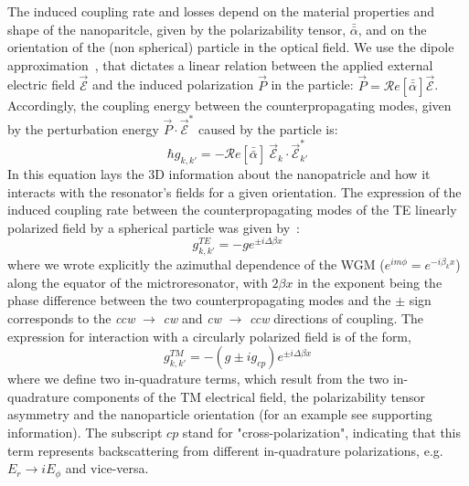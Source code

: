 \documentclass[journal=jacsat,manuscript=article]{achemso}
\begin{document}
The induced coupling rate and losses depend on the material properties and shape of the nanoparitcle, given by the polarizability tensor, $\bar{ \bar\alpha}$, and on the orientation of the (non spherical) particle in the optical field. We use the dipole approximation~\cite{mazzei2007}, that dictates a linear relation between the applied external electric field $ \vec {\mathcal {E}}$ and the induced polarization $\vec P$ in the particle: $ \vec {P} =\mathcal{R}e [\bar{ \bar \alpha}] \vec {\mathcal E} $. Accordingly, the coupling energy between the counterpropagating modes, given by the perturbation energy $ \vec {P} \cdot \vec {\mathcal E}^*$ caused by the particle is:
\begin{equation}\label{g_k_ktag}
    \hbar g_{k,k'}=  - \mathcal{R}e [\bar{\bar \alpha}] ~\vec{ \mathcal{E}}_k \cdot  \vec{ \mathcal{E}}^*_{k'}
\end{equation}
In this equation lays the 3D information about the nanopatricle and how it interacts with the resonator's fields for a given orientation. The expression of the induced coupling rate between the counterpropagating modes of the TE linearly polarized field by a spherical particle was given by~\cite{yi2011multiple}:
\begin{equation} \label{eq:g_TE_nanotube}
g^{TE}_{k,k'} = - g e^{\pm i \Delta\beta x}
\end{equation}
where we wrote explicitly the azimuthal dependence of the WGM ($e^{im\phi}=e^{-i\beta_k x}$) along the equator of the mictroresonator, with $2\beta x $ in the exponent being the phase difference between the two counterpropagating modes and the $\pm$ sign corresponds to the \textit{ccw} $\rightarrow$ \textit{cw} and \textit{cw} $\rightarrow$ \textit{ccw} directions of coupling.
The expression for interaction with a circularly polarized field is of the form,
\begin{equation} \label{eq:g_TM_nanotube}
    g^{TM}_{k,k'} = - \left ( g \pm ig_{cp} \right) e^{\pm i \Delta\beta x}
\end{equation}
where we define two in-quadrature terms, which result from the two in-quadrature components of the TM electrical field, the polarizability tensor asymmetry and the nanoparticle orientation  (for an example see supporting information). The subscript $cp$ stand for "cross-polarization", indicating that this term represents backscattering from different in-quadrature polarizations, e.g. $E_r \rightarrow iE_{\phi}$ and vice-versa.
\end{document}
